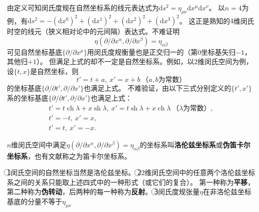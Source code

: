 由定义可知闵氏度规在自然坐标系的线元表达式为$\mathrm{d}s^2 = \eta_{\mu\nu}\mathrm{d}x^\mu\mathrm{d}x^\nu$。
以$n = 4$为例，有$\mathrm{d}s^2 = -(\mathrm{d}x^0)^2 + (\mathrm{d}x^1)^2 + (\mathrm{d}x^2)^2 + (\mathrm{d}x^3)^2$。
这正是熟知的$4$维闵氏时空的线元（狭义相对论中的元间隔）表达式。不难证明
$$\eta(\partial / \partial x^\alpha, \partial / \partial x^\beta) = \eta_{\alpha\beta}$$
可见自然坐标基底$\{\partial / \partial x^\mu\}$用闵氏度规衡量也是正交归一的（第$0$坐标基矢归$-1$，其他归$+1$）。
但满足上式的却不一定是自然坐标系。例如，以$2$维闵氏空间为例，设$\{t, x\}$是自然坐标，则
$$t' = t + a, ~ x' = x + b ~ \text{（$a, b$为常数）}$$
的坐标基底$\{\partial / \partial t', \partial / \partial x'\}$也满足上式。
不难验证，由以下三式分别定义的$\{t', x'\}$系的坐标基底$\{\partial / \partial t', \partial / \partial x'\}$也满足上式：
\begin{gather*}
t' = t\operatorname{ch}\lambda + x\operatorname{sh}\lambda, ~ x' = t\operatorname{sh}\lambda + x\operatorname{ch}\lambda ~ \text{（$\lambda$为常数）}, \\
t' = -t, ~ x' = x, \\
t' = t, ~ x' = -x.
\end{gather*}

\begin{definition}
$n$维闵氏空间中满足$\eta(\partial / \partial x^\alpha, \partial / \partial x^\beta) = \eta_{\alpha\beta}$的坐标系叫\textbf{洛伦兹坐标系}或\textbf{伪笛卡尔坐标系}，也有文献称之为笛卡尔坐标系。
\end{definition}

\begin{note}
\textcircled{1}闵氏空间的自然坐标当然是洛伦兹坐标。
\textcircled{2}$2$维闵氏空间中的任意两个洛伦兹坐标系之间的关系只能取上述四式中的一种形式（或它们的复合）。
第一种称为\textbf{平移}，第二种称为\textbf{伪转动}，后两种的每一种称为\textbf{反射}。
\textcircled{3}闵氏度规张量$\eta$在非洛伦兹坐标基底的分量不等于$\eta_{\mu\nu}$
\end{note}

